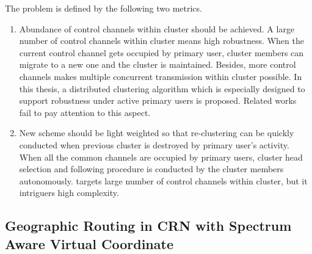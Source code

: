 The problem is defined by the following two metrics.
\begin{enumerate}
\item Abundance of control channels within cluster should be achieved.
A large number of control channels within cluster means high robustness.
When the current control channel gets occupied by primary user, cluster members can migrate to a new one and the cluster is maintained.
Besides, more control channels makes multiple concurrent transmission within cluster possible.
In this thesis, a distributed clustering algorithm which is especially designed to support robustness under active primary users is proposed.
Related works~\cite{Zhao07,Affinity_clustering_09icccn,Consensus_based_clustering12,clustering_globecom11} fail to pay attention to this aspect.

\item New scheme should be light weighted so that re-clustering can be quickly conducted when previous cluster is destroyed by primary user's activity.
When all the common channels are occupied by primary users, cluster head selection and following procedure is conducted by the cluster members autonomously.
\cite{LIU_TMC11_2} targets large number of control channels within cluster, but it intriguers high complexity.


%
\end{enumerate}

\subsection{Geographic Routing in CRN with Spectrum Aware Virtual Coordinate}

